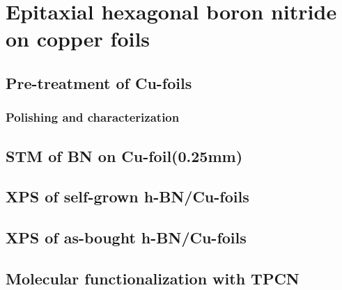 \documentclass[10pt,a4paper,twoside
,BCOR=8mm				%
,headings=normal		%
,headsepline			%
,footsepline			%
,plainfootsepline		%
]{scrbook}
\begin{document}
\chapter{Epitaxial hexagonal boron nitride on copper foils}
  
\section{Pre-treatment of Cu-foils}
  \subsection{Polishing and characterization}
  	
%      
%      
  \section{STM of BN on Cu-foil(0.25mm)}
     
  \section{XPS of self-grown h-BN/Cu-foils}
     
  \section{XPS of as-bought h-BN/Cu-foils}
     
  \section{Molecular functionalization with TPCN}
     
%    
%    
\end{document}
